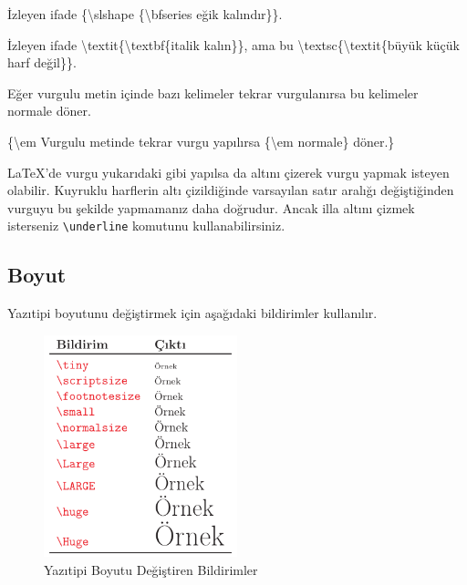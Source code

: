 \documentclass[
  10pt,
]{scrbook}
\newenvironment{Shaded}{\begin{snugshade}}{\end{snugshade}}
\newcommand{\FunctionTok}[1]{\textcolor[rgb]{0.00,0.00,0.00}{#1}}
\newcommand{\NormalTok}[1]{#1}
\theoremstyle{definition}
\theoremstyle{definition}
\theoremstyle{definition}
\theoremstyle{definition}
\theoremstyle{remark}
\begin{document}
\begin{Shaded}
\begin{Highlighting}[]
\NormalTok{İzleyen ifade \{}\FunctionTok{\textbackslash{}slshape}\NormalTok{ \{}\FunctionTok{\textbackslash{}bfseries}\NormalTok{ eğik kalındır\}\}.}
\end{Highlighting}
\end{Shaded}

\begin{Shaded}
\begin{Highlighting}[]
\NormalTok{İzleyen ifade }\FunctionTok{\textbackslash{}textit}\NormalTok{\{}\FunctionTok{\textbackslash{}textbf}\NormalTok{\{italik kalın\}\}, ama bu}
\FunctionTok{\textbackslash{}textsc}\NormalTok{\{}\FunctionTok{\textbackslash{}textit}\NormalTok{\{büyük küçük harf değil\}\}.}
\end{Highlighting}
\end{Shaded}

Eğer vurgulu metin içinde bazı kelimeler tekrar vurgulanırsa bu kelimeler normale döner.

\begin{Shaded}
\begin{Highlighting}[]
\NormalTok{\{}\FunctionTok{\textbackslash{}em}\NormalTok{ Vurgulu metinde tekrar}
\NormalTok{vurgu yapılırsa \{}\FunctionTok{\textbackslash{}em}\NormalTok{ normale\}}
\NormalTok{döner.\}}
\end{Highlighting}
\end{Shaded}

LaTeX'de vurgu yukarıdaki gibi yapılsa da altını çizerek vurgu yapmak isteyen olabilir. Kuyruklu harflerin altı çizildiğinde varsayılan satır aralığı değiştiğinden vurguyu bu şekilde yapmamanız daha doğrudur. Ancak illa altını çizmek isterseniz \texttt{\textbackslash{}underline} komutunu kullanabilirsiniz.

\hypertarget{boyut}{%
\subsection{Boyut}\label{boyut}}

Yazıtipi boyutunu değiştirmek için aşağıdaki bildirimler kullanılır.

\begin{figure}
\centering
\includegraphics[width=0.5\textwidth,height=\textheight]{images/yazitipi8.png}
\caption{Yazıtipi Boyutu Değiştiren Bildirimler}
\end{figure}
\end{document}
